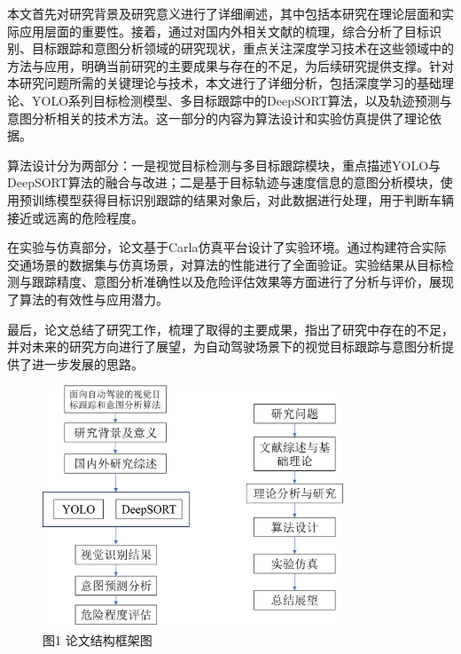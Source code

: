 本文首先对研究背景及研究意义进行了详细阐述，其中包括本研究在理论层面和实际应用层面的重要性。接着，通过对国内外相关文献的梳理，综合分析了目标识别、目标跟踪和意图分析领域的研究现状，重点关注深度学习技术在这些领域中的方法与应用，明确当前研究的主要成果与存在的不足，为后续研究提供支撑。针对本研究问题所需的关键理论与技术，本文进行了详细分析，包括深度学习的基础理论、YOLO系列目标检测模型、多目标跟踪中的DeepSORT算法，以及轨迹预测与意图分析相关的技术方法。这一部分的内容为算法设计和实验仿真提供了理论依据。

算法设计分为两部分：一是视觉目标检测与多目标跟踪模块，重点描述YOLO与DeepSORT算法的融合与改进；二是基于目标轨迹与速度信息的意图分析模块，使用预训练模型获得目标识别跟踪的结果对象后，对此数据进行处理，用于判断车辆接近或远离的危险程度。

在实验与仿真部分，论文基于Carla仿真平台设计了实验环境。通过构建符合实际交通场景的数据集与仿真场景，对算法的性能进行了全面验证。实验结果从目标检测与跟踪精度、意图分析准确性以及危险评估效果等方面进行了分析与评价，展现了算法的有效性与应用潜力。

最后，论文总结了研究工作，梳理了取得的主要成果，指出了研究中存在的不足，并对未来的研究方向进行了展望，为自动驾驶场景下的视觉目标跟踪与意图分析提供了进一步发展的思路。
\begin{figure}[htbp]
    \centering
    \includegraphics[width=0.8\textwidth]{images/p1_struct.pdf}  %
    \caption{图1 论文结构框架图}
    \label{fig:example_image}  %
\end{figure}




\begin{tabular}{l l}
\end{tabular}

